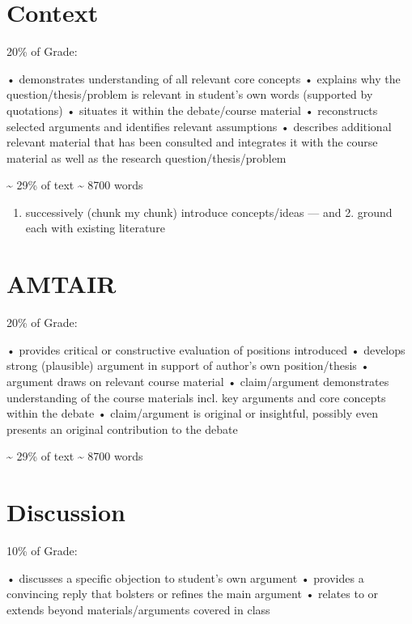 \documentclass[12pt,a4paper]{book}      %
\providecommand{\tightlist}{%
  \setlength{\itemsep}{0pt}\setlength{\parskip}{0pt}}
\begin{document}

\chapter{Context}\label{context}

20\% of Grade:

• demonstrates understanding of all relevant core concepts • explains
why the question/thesis/problem is relevant in student's own words
(supported by quotations) • situates it within the debate/course
material • reconstructs selected arguments and identifies relevant
assumptions • describes additional relevant material that has been
consulted and integrates it with the course material as well as the
research question/thesis/problem

\textasciitilde{} 29\% of text \textasciitilde{} 8700 words

\begin{enumerate}
\def\labelenumi{\arabic{enumi}.}
\tightlist
\item
  successively (chunk my chunk) introduce concepts/ideas --- and 2.
  ground each with existing literature
\end{enumerate}


\chapter{AMTAIR}\label{amtair}

20\% of Grade:

• provides critical or constructive evaluation of positions introduced •
develops strong (plausible) argument in support of author's own
position/thesis • argument draws on relevant course material •
claim/argument demonstrates understanding of the course materials incl.
key arguments and core concepts within the debate • claim/argument is
original or insightful, possibly even presents an original contribution
to the debate

\textasciitilde{} 29\% of text \textasciitilde{} 8700 words


\chapter{Discussion}\label{discussion}

10\% of Grade:

• discusses a specific objection to student's own argument • provides a
convincing reply that bolsters or refines the main argument • relates to
or extends beyond materials/arguments covered in class
\end{document}
